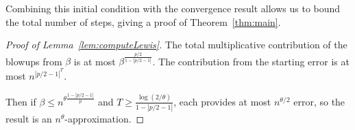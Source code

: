 Combining this initial condition with the convergence result allows us to bound
the total number of steps, giving a proof of Theorem~\ref{thm:main}.

\begin{proof}[Proof of Lemma~\ref{lem:computeLewis}]
The total multiplicative contribution of the blowups from $\beta$ is at most $\beta^{\frac{p/2}{1 - |p/2 - 1|}}$.
The contribution from the starting error is at most $n^{|p/2 - 1|^T}$.

Then if $\beta \leq n^{\theta \frac{1 - |p/2 - 1|}{p}}$ and $T \geq \frac{\log(2 / \theta)}{1 - |p/2 - 1|}$,
each provides at most $n^{\theta / 2}$ error, so the result is an $n^{\theta}$-approximation.
\end{proof}

